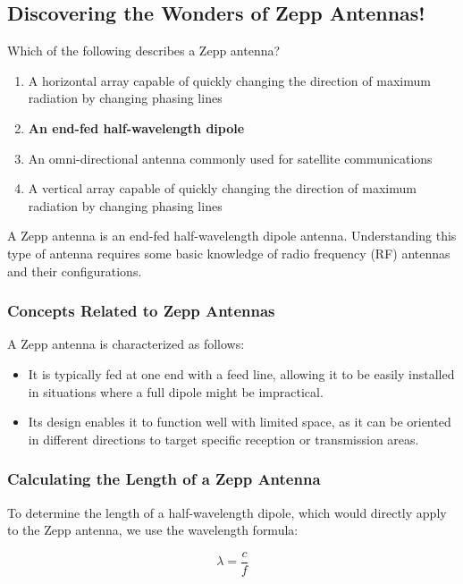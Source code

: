 \subsection{Discovering the Wonders of Zepp Antennas!}

\begin{tcolorbox}[colback=gray!10, colframe=black, title=E9C10] Which of the following describes a Zepp antenna? 
\begin{enumerate}[label=\Alph*.]
    \item A horizontal array capable of quickly changing the direction of maximum radiation by changing phasing lines
    \item \textbf{An end-fed half-wavelength dipole}
    \item An omni-directional antenna commonly used for satellite communications
    \item A vertical array capable of quickly changing the direction of maximum radiation by changing phasing lines
\end{enumerate} \end{tcolorbox}

A Zepp antenna is an end-fed half-wavelength dipole antenna. Understanding this type of antenna requires some basic knowledge of radio frequency (RF) antennas and their configurations. 

\subsubsection{Concepts Related to Zepp Antennas}
A Zepp antenna is characterized as follows:
\begin{itemize}
    \item It is typically fed at one end with a feed line, allowing it to be easily installed in situations where a full dipole might be impractical.
    \item Its design enables it to function well with limited space, as it can be oriented in different directions to target specific reception or transmission areas.
\end{itemize}

\subsubsection{Calculating the Length of a Zepp Antenna}
To determine the length of a half-wavelength dipole, which would directly apply to the Zepp antenna, we use the wavelength formula:

\[
\lambda = \frac{c}{f}
\]

